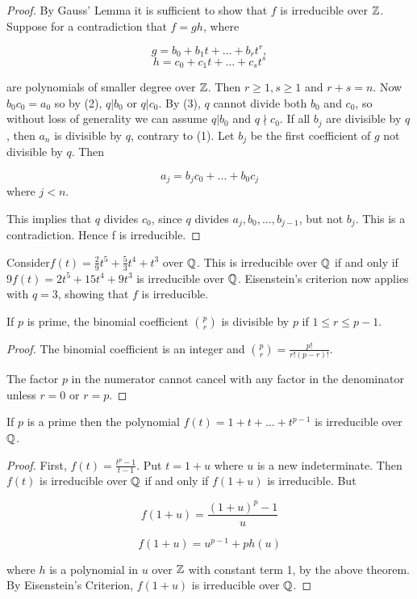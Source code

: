 \begin{proof}
By Gauss' Lemma it is sufficient to show that $f$ is irreducible over $\mathbb Z$. Suppose for a contradiction that $f = gh$, where

$$
g=b_0+b_1 t+ ... +b_r t^r,
$$
$$
h=c_0+c_1 t+ ... +c_s t^s
$$

are polynomials of smaller degree over $\mathbb Z$. Then $r \ge 1, s \ge 1$ and $r+s = n$. Now $b_0 c_0 = a_0$ so by (2), $q | b_0$ or $q|c_0$. By (3), $q$ cannot divide both $b_0$ and $c_0$, so without
loss of generality we can assume $q | b_0$ and $q \nmid c_0$. If all $b_j$ are divisible by $q$, then $a_n$ is divisible by $q$, contrary to (1). Let $b_j$ be the first coefficient of $g$ not divisible by $q$. Then

$$
a_j = b_j c_0 + ...+ b_0 c_j
$$
where $j < n$.

 This implies that $q$ divides $c_0$, since $q$ divides $a_j, b_0,..., b_{j-1}$, but not $b_j$. This is a contradiction. Hence f is irreducible.
\end{proof}

\begin{example}
Consider$
f(t) = \frac{2}{9} t^5 + \frac{5}{3} t^4 + t^3 
$ over $\mathbb Q$. This is irreducible over $\mathbb Q$ if and only if $
9f(t) = 2t^5 + 15t^4 + 9t^3
$
is irreducible over $\mathbb Q$. Eisenstein's criterion now applies with $q = 3$, showing that $f$ is irreducible.
\end{example}

\begin{theorem}
If $p$ is prime, the binomial coefficient $\binom{p}{r}$ is divisible by $p$ if $1 \le r \le p-1$.
\end{theorem}

\begin{proof}
The binomial coefficient is an integer and $\binom{p}{r} = \frac{p!}{r!(p-r)!}$.

The factor $p$ in the numerator cannot cancel with any factor in the denominator unless $r=0$ or $r=p$.
\end{proof}

\begin{theorem}\label{thm:irreducible-prime-polynomial}
    If $p$ is a prime then the polynomial
    $
    f(t) = 1 + t + ... + t^{p-1}
    $
    is irreducible over $\mathbb Q$.
\end{theorem}

\begin{proof}
First, $f(t) = \frac{t^p - 1}{t - 1}$. Put $t = 1 + u$ where $u$ is a new indeterminate. Then $f(t)$ is irreducible over $\mathbb Q$ if and only if $f(1+u)$ is irreducible. But

$$
f(1+u) = \frac{(1+u)^p - 1}{u}
$$

$$
f(1+u) = u^{p-1} + ph(u)
$$

where $h$ is a polynomial in $u$ over $\mathbb Z$ with constant term 1, by the above theorem. By Eisenstein's Criterion, $f(1+u)$ is irreducible over $\mathbb Q$.
\end{proof}

